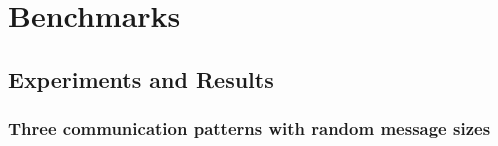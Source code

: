 \section{Benchmarks}
\label{sec:benchmark}





%



\subsection{Experiments and Results}



\subsubsection {Three communication patterns with random message sizes}


%

